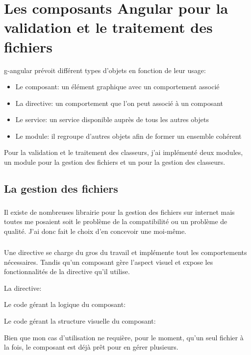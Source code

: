 \chapter{Les composants Angular pour la validation et le traitement des fichiers}
\label{ch:angular-components}

\Gls{g-angular} prévoit différent types d'objets en fonction de leur usage:
\begin{itemize}
    \item Le composant: un élément graphique avec un comportement associé
    \item La directive: un comportement que l'on peut associé à un composant
    \item Le service: un service disponible auprès de tous les autres objets
    \item Le module: il regroupe d'autres objets afin de former un ensemble cohérent
\end{itemize}

Pour la validation et le traitement des classeurs, j'ai implémenté deux modules, un module pour la gestion des fichiers et un pour la gestion des classeurs.

\section{La gestion des fichiers}
\label{sec:file-management}

\paragraph{}
Il existe de nombreuses librairie pour la gestion des fichiers sur internet mais toutes me posaient soit le problème de la compatibilité ou un problème de qualité.
J'ai donc fait le choix d'en concevoir une moi-même.

\paragraph{}
Une directive se charge du gros du travail et implémente tout les comportements nécessaires.
Tandis qu'un composant gère l'aspect visuel et expose les fonctionnalités de la directive qu'il utilise.

La directive:


Le code gérant la logique du composant:


Le code gérant la structure visuelle du composant:

Bien que mon cas d'utilisation ne requière, pour le moment, qu'un seul fichier à la fois, le composant est déjà prêt pour en gérer plusieurs.

